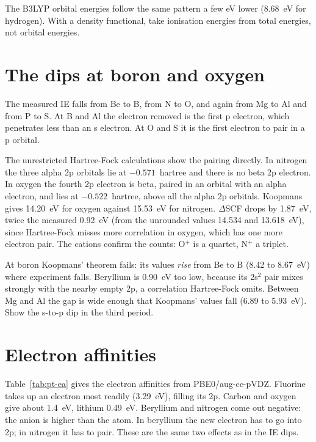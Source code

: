 The B3LYP orbital energies follow the same pattern a few eV lower (8.68~eV for hydrogen). With a density functional, take ionisation energies from total energies, not orbital energies.

\section{The dips at boron and oxygen}
\label{sec:pt-dips}
The measured IE falls from Be to B, from N to O, and again from Mg to Al and from P to S. At B and Al the electron removed is the first p electron, which penetrates less than an s electron. At O and S it is the first electron to pair in a p orbital.

The unrestricted Hartree-Fock calculations show the pairing directly. In nitrogen the three alpha 2p orbitals lie at $-0.571$~hartree and there is no beta 2p electron. In oxygen the fourth 2p electron is beta, paired in an orbital with an alpha electron, and lies at $-0.522$~hartree, above all the alpha 2p orbitals. Koopmans gives 14.20~eV for oxygen against 15.53~eV for nitrogen. $\Delta$SCF drops by 1.87~eV, twice the measured 0.92~eV (from the unrounded values 14.534 and 13.618~eV), since Hartree-Fock misses more correlation in oxygen, which has one more electron pair. The cations confirm the counts: O$^+$ is a quartet, N$^+$ a triplet.

At boron Koopmans' theorem fails: its values \emph{rise} from Be to B (8.42 to 8.67~eV) where experiment falls. Beryllium is 0.90~eV too low, because its 2s$^2$ pair mixes strongly with the nearby empty 2p, a correlation Hartree-Fock omits. Between Mg and Al the gap is wide enough that Koopmans' values fall (6.89 to 5.93~eV). Show the s-to-p dip in the third period.

\section{Electron affinities}
Table~\ref{tab:pt-ea} gives the electron affinities from PBE0/aug-cc-pVDZ. Fluorine takes up an electron most readily (3.29~eV), filling its 2p. Carbon and oxygen give about 1.4~eV, lithium 0.49~eV. Beryllium and nitrogen come out negative: the anion is higher than the atom. In beryllium the new electron has to go into 2p; in nitrogen it has to pair. These are the same two effects as in the IE dips.

